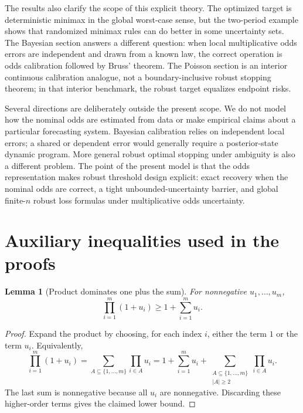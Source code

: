 \documentclass[11pt,a4paper]{article}
\newtheorem{lemma}{Lemma}
\begin{document}
The results also clarify the scope of this explicit theory.  The optimized
target is deterministic minimax in the global worst-case sense, but the
two-period example shows that randomized minimax rules can do better in some
uncertainty sets.  The Bayesian section answers a different question: when local
multiplicative odds errors are independent and drawn from a known law, the
correct operation is odds calibration followed by Bruss' theorem.  The Poisson
section is an interior continuous calibration analogue, not a boundary-inclusive
robust stopping theorem; in that interior benchmark, the robust target equalizes
endpoint risks.

Several directions are deliberately outside the present scope.  We do not model
how the nominal odds are estimated from data or make empirical claims about a
particular forecasting system.  Bayesian calibration relies on independent local
errors; a shared or dependent error would generally require a posterior-state
dynamic program.  More general robust optimal stopping under ambiguity is also a
different problem.  The point of the present model is that the odds
representation makes robust threshold design explicit: exact recovery when the
nominal odds are correct, a tight unbounded-uncertainty barrier, and global
finite-\(n\) robust loss formulas under multiplicative odds uncertainty.

\appendix

\section{Auxiliary inequalities used in the proofs}

\begin{lemma}[Product dominates one plus the sum]
For nonnegative \(u_1,\dots,u_m\),
\[
  \prod_{i=1}^m(1+u_i)\ge1+\sum_{i=1}^m u_i.
\]
\end{lemma}

\begin{proof}
Expand the product by choosing, for each index \(i\), either the term \(1\) or
the term \(u_i\).  Equivalently,
\[
  \prod_{i=1}^m(1+u_i)
  =
  \sum_{A\subseteq\{1,\dots,m\}}\prod_{i\in A}u_i
  =
  1+\sum_{i=1}^m u_i
  +\sum_{\substack{A\subseteq\{1,\dots,m\}\\ |A|\ge2}}\prod_{i\in A}u_i .
\]
The last sum is nonnegative because all \(u_i\) are nonnegative.  Discarding
these higher-order terms gives the claimed lower bound.
\end{proof}
\end{document}
